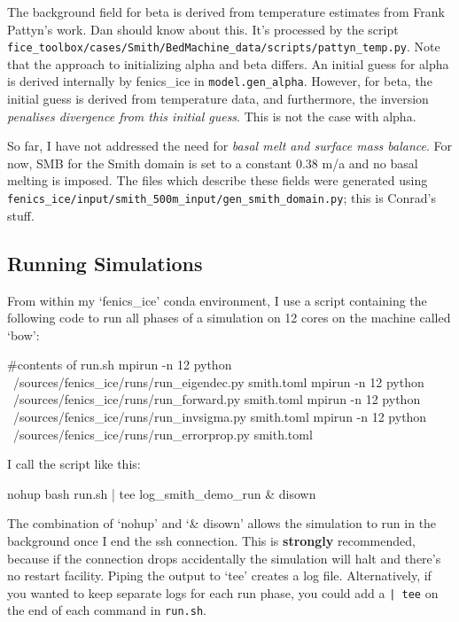 \documentclass[11pt, reqno, nocenter]{article}
\begin{document}
The background field for beta is derived from temperature estimates from Frank Pattyn's work. Dan should know about this. It's processed by the script\\
 {\tt fice\_toolbox/cases/Smith/BedMachine\_data/scripts/pattyn\_temp.py}. Note that the approach to initializing alpha and beta differs. An initial guess for alpha is derived internally by fenics\_ice in {\tt model.gen\_alpha}. However, for beta, the initial guess is derived from temperature data, and furthermore, the inversion \emph{penalises divergence from this initial guess}. This is not the case with alpha.

So far, I have not addressed the need for \emph{basal melt and surface mass balance}. For now, SMB for the Smith domain is set to a constant 0.38 m/a and no basal melting is imposed. The files which describe these fields were generated using\\ {\tt fenics\_ice/input/smith\_500m\_input/gen\_smith\_domain.py}; this is Conrad's stuff.

\subsection{Running Simulations}

From within my `fenics\_ice' conda environment, I use a script containing the following code to run all phases of a simulation on 12 cores on the machine called `bow':

\begin{spverbatim}
#contents of run.sh
mpirun -n 12 python ~/sources/fenics_ice/runs/run_eigendec.py smith.toml
mpirun -n 12 python ~/sources/fenics_ice/runs/run_forward.py smith.toml
mpirun -n 12 python ~/sources/fenics_ice/runs/run_invsigma.py smith.toml
mpirun -n 12 python ~/sources/fenics_ice/runs/run_errorprop.py smith.toml
\end{spverbatim}

I call the script like this:
\begin{spverbatim}
nohup bash run.sh | tee log_smith_demo_run & disown
\end{spverbatim}

The combination of `nohup' and `\& disown' allows the simulation to run in the background once I end the ssh connection. This is \textbf{strongly} recommended, because if the connection drops accidentally the simulation will halt and there's no restart facility. Piping the output to `tee' creates a log file. Alternatively, if you wanted to keep separate logs for each run phase, you could add a {\tt | tee} on the end of each command in {\tt run.sh}.
\end{document}
